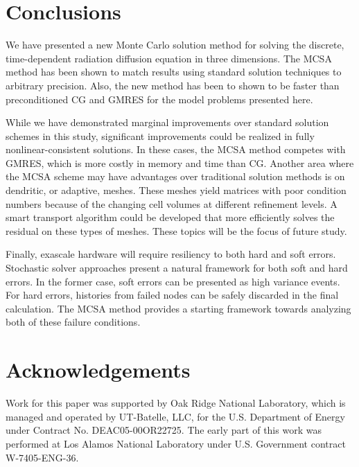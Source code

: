 \documentclass[preprint,12pt]{elsarticle}
\begin{document}
\section{Conclusions}
\label{sec:conclusions}

We have presented a new Monte Carlo solution method for solving the discrete,
time-dependent radiation diffusion equation in three dimensions.  The MCSA
method has been shown to match results using standard solution techniques to
arbitrary precision. Also, the new method has been to shown to be faster than
preconditioned CG and GMRES for the model problems presented here.

While we have demonstrated marginal improvements over standard solution
schemes in this study, significant improvements could be realized in fully
nonlinear-consistent solutions.  In these cases, the MCSA method competes with
GMRES, which is more costly in memory and time than CG.  Another area where
the MCSA scheme may have advantages over traditional solution methods is on
dendritic, or adaptive, meshes.  These meshes yield matrices with poor
condition numbers because of the changing cell volumes at different refinement
levels.  A smart transport algorithm could be developed that more efficiently
solves the residual on these types of meshes.  These topics will be the focus
of future study.

Finally, exascale hardware will require resiliency to both hard and soft
errors.  Stochastic solver approaches present a natural framework for both
soft and hard errors.  In the former case, soft errors can be presented as
high variance events.  For hard errors, histories from failed nodes can be
safely discarded in the final calculation. The MCSA method provides a starting
framework towards analyzing both of these failure conditions.

\section*{Acknowledgements}

Work for this paper was supported by Oak Ridge National Laboratory, which is
managed and operated by UT-Batelle, LLC, for the U.S. Department of Energy
under Contract No. DEAC05-00OR22725.  The early part of this work was
performed at Los Alamos National Laboratory under U.S. Government contract
W-7405-ENG-36.
\end{document}
